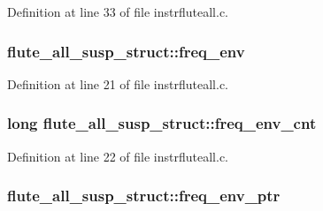 Definition at line 33 of file instrfluteall.\+c.

\subsubsection[{\texorpdfstring{freq\+\_\+env}{freq_env}}]{ flute\+\_\+all\+\_\+susp\+\_\+struct\+::freq\+\_\+env}\hypertarget{structflute__all__susp__struct_ad66dd4b1e5248a4feb91cfff31000f1b}{}\label{structflute__all__susp__struct_ad66dd4b1e5248a4feb91cfff31000f1b}


Definition at line 21 of file instrfluteall.\+c.

\subsubsection[{\texorpdfstring{freq\+\_\+env\+\_\+cnt}{freq_env_cnt}}]{\setlength{\rightskip}{0pt plus 5cm}long flute\+\_\+all\+\_\+susp\+\_\+struct\+::freq\+\_\+env\+\_\+cnt}\hypertarget{structflute__all__susp__struct_aff71c1c9cf7f443da6bb3c6ee17ce0c4}{}\label{structflute__all__susp__struct_aff71c1c9cf7f443da6bb3c6ee17ce0c4}


Definition at line 22 of file instrfluteall.\+c.

\subsubsection[{\texorpdfstring{freq\+\_\+env\+\_\+ptr}{freq_env_ptr}}]{ flute\+\_\+all\+\_\+susp\+\_\+struct\+::freq\+\_\+env\+\_\+ptr}\hypertarget{structflute__all__susp__struct_ac46e87153a2b41a82d50a7fb33a20cba}{}\label{structflute__all__susp__struct_ac46e87153a2b41a82d50a7fb33a20cba}


